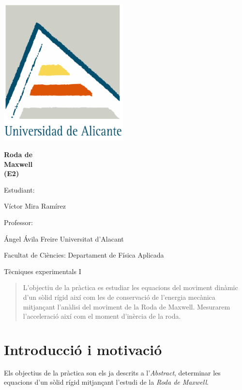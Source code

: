\documentclass[11pt]{article}
\newcommand{\titulo}{Roda de\\Maxwell\vspace{0.5cm}\\(E2)}
\newcommand{\nombreestudiante}{Víctor Mira Ramírez}
\newcommand{\nombredirector}{Ángel Ávila Freire}
\newcommand{\fecha}{\date{Maig 2023}}  %
\begin{document}
\begin{titlepage}
	\centering
	\includegraphics[width=65mm]{fotos/logoUA.png}\par
	\vspace{1cm}
	{\huge\bfseries \vspace{15mm} \titulo \par}
	\vfill
	{\large 
	\vfill
	Estudiant:\par\vspace{2mm}
	\nombreestudiante\par
	\vfill
	Professor:\par\vspace{2mm}
    \nombredirector
    \vfill
    Universitat d'Alacant\par
    Facultat de Ciències: Departament de Física Aplicada\par
    Tècniques experimentals I\par
	\fecha\par}
\end{titlepage}

\pagebreak

\begin{abstract}\label{sec:abstract}
    \noindent L'objectiu de la pràctica es estudiar les equacions del moviment dinàmic d'un sòlid rígid així com les de conservació de l'energia mecànica mitjançant l'anàlisi del moviment de la Roda de Maxwell. Mesurarem l'acceleració així com el moment d'inèrcia de la roda.
\end{abstract}

\vspace{0.3cm}
\tableofcontents
\newpage

\section{Introducció i motivació}
    Els objectius de la pràctica son els ja descrits a l'\textit{Abstract}, determinar les equacions d'un sòlid rígid mitjançant l'estudi de la \textit{Roda de Maxwell}.  
\end{document}
